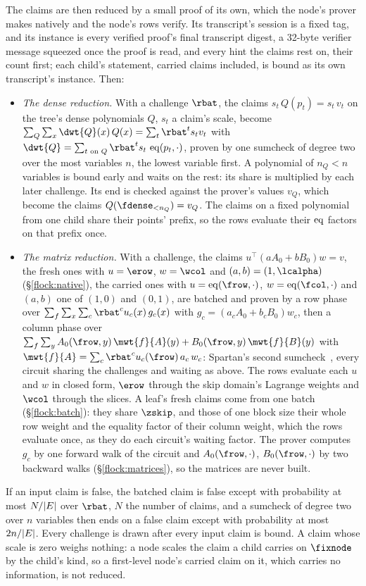 The claims are then reduced by a small proof of its own, which the node's prover makes natively and the node's rows verify. Its transcript's session is a fixed tag, and its instance is every verified proof's final transcript digest, a 32-byte verifier message squeezed once the proof is read, and every hint the claims rest on, their count first; each child's statement, carried claims included, is bound as its own transcript's instance. Then:
\begin{itemize}[itemsep=1pt,topsep=3pt]
\item \emph{The dense reduction.} With a challenge $\rbat$, the claims $s_t\,Q(p_t)=s_t\,v_t$ on the tree's dense polynomials $Q$, $s_t$ a claim's scale, become $\sum_Q\sum_x\dwt{Q}(x)\,Q(x)=\sum_t\rbat^t s_tv_t$ with $\dwt{Q}=\sum_{t\text{ on }Q}\rbat^t s_t\,\eq(p_t,\cdot)$, proven by one sumcheck of degree two over the most variables $n$, the lowest variable first. A polynomial of $n_Q<n$ variables is bound early and waits on the rest: its share is multiplied by each later challenge. Its end is checked against the prover's values $v_Q$, which become the claims $Q({\fdense}_{<n_Q})=v_Q$. The claims on a fixed polynomial from one child share their points' prefix, so the rows evaluate their $\operatorname{eq}$ factors on that prefix once.
\item \emph{The matrix reduction.} With a challenge, the claims $u^{\top}(aA_0+bB_0)w=v$, the fresh ones with $u=\erow$, $w=\wcol$ and $(a,b)=(1,\lcalpha)$ (\S\ref{flock:native}), the carried ones with $u=\eq(\frow,\cdot)$, $w=\eq(\fcol,\cdot)$ and $(a,b)$ one of $(1,0)$ and $(0,1)$, are batched and proven by a row phase over $\sum_f\sum_x\sum_c\rbat^cu_c(x)\,g_c(x)$ with $g_c=(a_cA_0+b_cB_0)w_c$, then a column phase over $\sum_f\sum_y A_0(\frow,y)\,\mwt{f}{A}(y)+B_0(\frow,y)\,\mwt{f}{B}(y)$ with $\mwt{f}{A}=\sum_c\rbat^cu_c(\frow)\,a_c\,w_c$: Spartan's second sumcheck~\cite{Set20}, every circuit sharing the challenges and waiting as above. The rows evaluate each $u$ and $w$ in closed form, $\erow$ through the skip domain's Lagrange weights and $\wcol$ through the slices. A leaf's fresh claims come from one batch (\S\ref{flock:batch}): they share $\zskip$, and those of one block size their whole row weight and the equality factor of their column weight, which the rows evaluate once, as they do each circuit's waiting factor. The prover computes $g_c$ by one forward walk of the circuit and $A_0(\frow,\cdot)$, $B_0(\frow,\cdot)$ by two backward walks (\S\ref{flock:matrices}), so the matrices are never built.
\end{itemize}
If an input claim is false, the batched claim is false except with probability at most $N/|E|$ over $\rbat$, $N$ the number of claims, and a sumcheck of degree two over $n$ variables then ends on a false claim except with probability at most $2n/|E|$. Every challenge is drawn after every input claim is bound. A claim whose scale is zero weighs nothing: a node scales the claim a child carries on $\fixnode$ by the child's kind, so a first-level node's carried claim on it, which carries no information, is not reduced.

